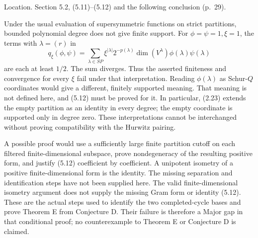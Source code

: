 \documentclass[10pt]{article}
\begin{document}
Location. Section 5.2, (5.11)–(5.12) and the following conclusion (p. 29).\par
Under the usual evaluation of supersymmetric functions on strict partitions, bounded polynomial degree does not give finite support. For \(\phi=\psi=1,\xi=1\), the terms with \(\lambda=(r)\) in \[q_\xi(\phi,\psi)=
 \sum_{\lambda\in SP}\xi^{|\lambda|}2^{-p(\lambda)}
 \dim(V^\lambda)\phi(\lambda)\psi(\lambda)\] are each at least \(1/2\). The sum diverges. Thus the asserted finiteness and convergence for every \(\xi\) fail under that interpretation. Reading \(\phi(\lambda)\) as Schur-\(Q\) coordinates would give a different, finitely supported meaning. That meaning is not defined here, and (5.12) must be proved for it. In particular, (2.23) extends the empty partition as an identity in every degree; the empty coordinate is supported only in degree zero. These interpretations cannot be interchanged without proving compatibility with the Hurwitz pairing.\par
A possible proof would use a sufficiently large finite partition cutoff on each filtered finite-dimensional subspace, prove nondegeneracy of the resulting positive form, and justify (5.12) coefficient by coefficient. A unipotent isometry of a positive finite-dimensional form is the identity. The missing separation and identification steps have not been supplied here. The valid finite-dimensional isometry argument does not supply the missing Gram form or identity (5.12). These are the actual steps used to identify the two completed-cycle bases and prove Theorem E from Conjecture D. Their failure is therefore a Major gap in that conditional proof; no counterexample to Theorem E or Conjecture D is claimed.\par
\end{document}
